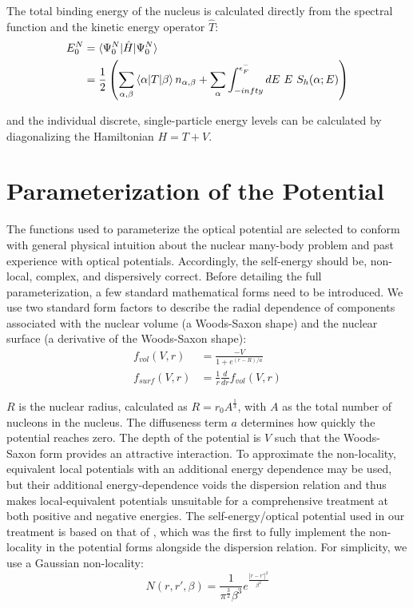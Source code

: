 The total binding energy of the nucleus is calculated directly from the spectral function and the
kinetic energy operator $\hat{T}$:
\begin{equation} \label{TotalEnergyEquation}
    \begin{split}
        E^{N}_{0} & = \braket{\Psi^{N}_{0}|\hat{H}|\Psi^{N}_{0}}\\
        & = \frac{1}{2} \left(\sum_{\alpha,\beta}\braket{\alpha|T|\beta}n_{\alpha,\beta}
        + \sum_{\alpha}\int_{-infty}^{\epsilon_{F}^{-}}dE\ E\ S_{h}(\alpha;E)\right)
    \end{split}
\end{equation}

\noindent
and the individual discrete, single-particle energy levels can be calculated by diagonalizing the
Hamiltonian $H = T + V$.

\section{Parameterization of the Potential}
The functions used to parameterize the optical potential
are selected to conform with general physical intuition about the nuclear
many-body problem and past experience with optical potentials. Accordingly,
the self-energy should be, non-local, complex, and dispersively correct.
Before detailing the full parameterization,
a few standard mathematical forms need to be introduced. We use two standard form factors
to describe the radial dependence of components
associated with the nuclear volume (a Woods-Saxon shape)
and the nuclear surface (a derivative of the Woods-Saxon shape):
\begin{equation} \label{WoodsSaxon}
    \begin{split}
        f_{vol}(V,r) & = \frac{-V}{1+e^{(r-R)/a}}\\
        f_{surf}(V,r) & = \frac{1}{r}\frac{d}{dr}f_{vol}(V,r)
    \end{split}
\end{equation}

\noindent
$R$ is the nuclear radius, calculated as $R = r_{0}A^{\frac{1}{3}}$, with $A$ as the total number of
nucleons in the nucleus. The diffuseness term $a$ determines how quickly the potential reaches zero.
The depth of the potential is $V$ such that the Woods-Saxon form
provides an attractive interaction.
To approximate the non-locality, equivalent local potentials \cite{Mahaux1991}
with an additional energy dependence may be used, but their additional energy-dependence
voids the dispersion relation and thus makes local-equivalent potentials unsuitable
for a comprehensive treatment at both positive and negative energies.
The self-energy/optical potential used in our treatment is based on that of
\cite{MahzoonPhDThesis}, which was the first to fully implement the non-locality in the potential
forms alongside the dispersion relation. For simplicity, we use a Gaussian non-locality:
\begin{equation}
    N(r, r',\beta) = \frac{1}{\pi^{\frac{3}{2}}\beta^{3}} e^{\frac{|r-r'|^{2}}{\beta^{2}}}
\end{equation}

